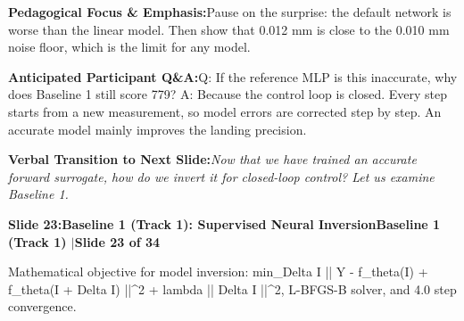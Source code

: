 \documentclass[11pt,a4paper]{article}
\begin{document}
\begin{tcolorbox}[colback=lightbg,colframe=bordergray,left=6pt,right=6pt,top=3pt,bottom=3pt,boxrule=0.6pt,arc=2.5pt]
\small
\noindent\textbf{\color{navy}Pedagogical Focus \& Emphasis:}\enspace Pause on the surprise: the default network is worse than the linear model. Then show that 0.012 mm is close to the 0.010 mm noise floor, which is the limit for any model.\par\vspace{0.3em}
\noindent\textbf{\color{successgreen}Anticipated Participant Q\&A:}\enspace Q: If the reference MLP is this inaccurate, why does Baseline 1 still score 779? A: Because the control loop is closed. Every step starts from a new measurement, so model errors are corrected step by step. An accurate model mainly improves the landing precision.\par\vspace{0.3em}
\noindent\textbf{\color{accent}Verbal Transition to Next Slide:}\enspace \emph{Now that we have trained an accurate forward surrogate, how do we invert it for closed-loop control? Let us examine Baseline 1.}
\end{tcolorbox}
\clearpage
\hypertarget{slide.23}{}
{}
\noindent\begin{tcolorbox}[colback=navy,colframe=navy,left=6pt,right=6pt,top=3pt,bottom=3pt,boxrule=0pt,arc=2pt]
{\large\bfseries\color{white}Slide 23:\enspace Baseline 1 (Track 1): Supervised Neural Inversion}\hfill{\footnotesize\bfseries\color{white!85!lightbg}Baseline 1 (Track 1) \enspace$|$\enspace Slide 23 of 34}
\end{tcolorbox}
\vspace{0.2em}
\begin{tcolorbox}[colback=lightbg,colframe=bordergray,title={\footnotesize\bfseries\color{darkgray}Slide Visual Blueprint},fontupper=\small,left=6pt,right=6pt,top=2.5pt,bottom=2.5pt,boxrule=0.6pt,arc=2.5pt]
Mathematical objective for model inversion: min\_{Delta I} || Y - f\_theta(I) + f\_theta(I + Delta I) ||\textasciicircum{}2 + lambda || Delta I ||\textasciicircum{}2, L-BFGS-B solver, and 4.0 step convergence.
\end{tcolorbox}
\vspace{0.2em}
\end{document}
